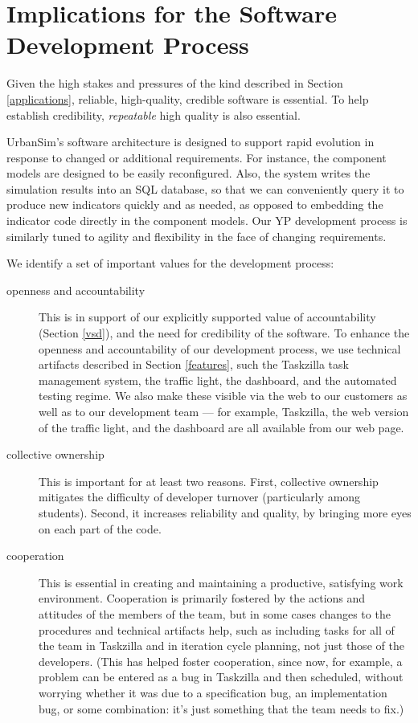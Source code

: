 \documentclass[times, 10pt,twocolumn]{article}
\begin{document}
\section{Implications for the Software Development Process}
\label{implications}

Given the high stakes and pressures of the kind described in Section
\ref{applications}, reliable, high-quality, credible software is essential.
To help establish credibility, \emph{repeatable} high quality is also
essential.

UrbanSim's software architecture is designed to support rapid evolution in
response to changed or additional requirements. For instance, the component
models are designed to be easily reconfigured.  Also, the system writes the
simulation results into an SQL database, so that we can conveniently query
it to produce new indicators quickly and as needed, as opposed to embedding
the indicator code directly in the component models.  Our YP development
process is similarly tuned to agility and flexibility in the face of
changing requirements.

We identify a set of important values for the development process:

\begin{description}

\item[openness and accountability] This is in support of our explicitly
  supported value of accountability (Section \ref{vsd}), and the need for
  credibility of the software.  To enhance the openness and accountability
  of our development process, we use technical artifacts described in
  Section \ref{features}, such the Taskzilla task management system, the
  traffic light, the dashboard, and the automated testing regime.  We 
  also make these visible via the web to our customers as well as to
  our development team --- for example, Taskzilla, the web version of the
  traffic light, and the dashboard are all available from our web page.

\item[collective ownership] This is important for at least two reasons.
  First, collective ownership mitigates the difficulty of developer
  turnover (particularly among students).  Second, it increases reliability
  and quality, by bringing more eyes on each part of the code.

\item[cooperation] This is essential in creating and maintaining a 
  productive, satisfying work
  environment.  Cooperation is primarily fostered by the actions and
  attitudes of the members of the team, but in some cases changes to the
  procedures and technical artifacts help, such as including tasks for all
  of the team in Taskzilla and in iteration cycle planning, not just those
  of the developers.  (This has helped foster cooperation, since now, for
  example, a problem can be entered as a bug in Taskzilla and then
  scheduled, without worrying whether it
  was due to a specification bug, an implementation bug, or some
  combination: it's just something that the team needs to fix.)

\end{description}
\end{document}

